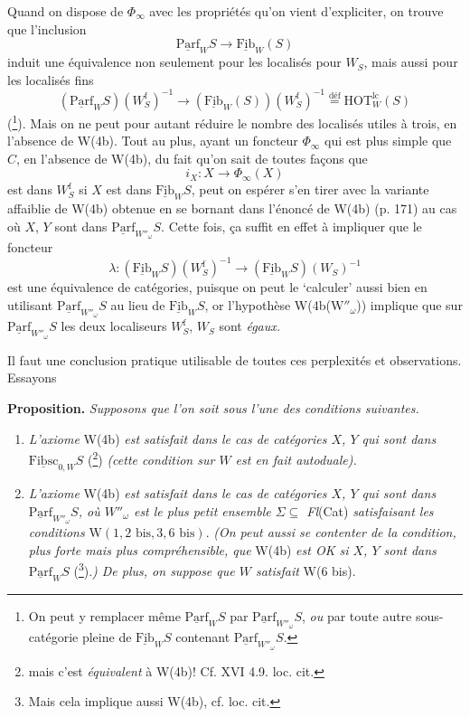 \documentclass[11pt]{article}
\newcommand{\printedpage}[1]{\marginpar{\footnotesize p.~#1}}
\newcommand{\msp}[1]{\marginpar{\footnotesize [#1]}}
\newcommand{\und}[1]{\underline{\mathrm{#1}}}
\begin{document}
Quand on dispose de $\Phi_\infty$ avec les propriétés qu'on vient d'expliciter, on trouve que l'inclusion
\[
\und{Parf}_W S \longrightarrow \und{Fib}_W(S)
\]
induit une équivalence non seulement pour les localisés pour $W_S$, mais aussi pour les localisés fins
\[
(\und{Parf}_W S)(W_S^{\mathrm{f}})^{-1} \longrightarrow (\und{Fib}_W(S))(W_S^{\mathrm{f}})^{-1} \overset{\text{déf}}{=} \mathrm{HOT}^{\mathrm{lc}}_W(S)
\]
(\footnote[94]{On peut y remplacer même $\und{Parf}_W S$ par $\und{Parf}_{W''_\omega} S$, \textit{ou} par toute autre sous-catégorie pleine de $\und{Fib}_W S$ contenant $\und{Parf}_{W''_\omega} S$.}). Mais on ne peut pour autant réduire le nombre des localisés utiles à trois, en l'absence de W(4b). Tout au plus, ayant un foncteur $\Phi_\infty$ qui est plus simple que $C$, en l'absence de W(4b), du fait qu'on sait de toutes façons que
\[
i_X : X \longrightarrow \Phi_\infty(X)
\]
est dans $W_S^{\mathrm{f}}$ si $X$ est dans $\und{Fib}_W S$, peut on
\printedpage{121}
\msp{page 196}
espérer s'en tirer avec la variante affaiblie de W(4b) obtenue en se bornant dans l'énoncé de W(4b) (p. 171) au cas où $X$, $Y$ sont dans $\und{Parf}_{W''_\omega} S$. Cette fois, ça suffit en effet à impliquer que le foncteur
\[
\lambda : (\und{Fib}_W S)(W_S^{\mathrm{f}})^{-1} \longrightarrow (\und{Fib}_W S)(W_S)^{-1}
\]
est une équivalence de catégories, puisque on peut le ‘calculer’ aussi bien en utilisant $\und{Parf}_{W''_\omega} S$ au lieu de $\und{Fib}_W S$, or l'hypothèse W(4b($\mathrm{W}''_\omega$)) implique que sur $\und{Parf}_{W''_\omega} S$ les deux localiseurs $W_S^{\mathrm{f}}$, $W_S$ sont \textit{égaux.}

Il faut une conclusion pratique utilisable de toutes ces perplexités et observations. Essayons

\textbf{Proposition.} \textit{Supposons que l'on soit sous l'une des conditions suivantes.}

\begin{enumerate}[label={}]
\item[$1^o$)] \textit{L'axiome} W(4b) \textit{est satisfait dans le cas de catégories $X$, $Y$ qui sont dans} $\und{Fibsc}_{0,W} S$ (\footnote[95]{mais c'est \textit{équivalent} à W(4b)! Cf. XVI 4.9. loc. cit.}) \textit{(cette condition sur $W$ est en fait autoduale).}

\item[$2^o$)] \textit{L'axiome} W(4b) \textit{est satisfait dans le cas de catégories $X$, $Y$ qui sont dans} $\und{Parf}_{W''_\omega} S$\textit{, où $W''_\omega$ est le plus petit ensemble $\Sigma \subseteq$ Fl}(Cat) \textit{satisfaisant les conditions} $\mathrm{W}(1, 2\text{ bis}, 3, 6\text{ bis})$. \textit{(On peut aussi se contenter de la condition, plus forte mais plus compréhensible, que} W(4b) \textit{est OK si $X$, $Y$ sont dans} $\und{Parf}_W S$ (\footnote[96]{Mais cela implique aussi W(4b), cf. loc. cit.}).\textit{) De plus, on suppose que $W$ satisfait} W(6 bis).
\end{enumerate}
\end{document}
